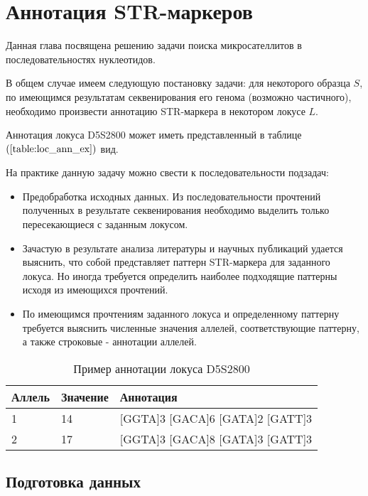 \chapter{Аннотация STR-маркеров}

Данная глава посвящена решению задачи поиска микросателлитов в последовательностях нуклеотидов.

В общем случае имеем следующую постановку задачи:
для некоторого образца $S$, по имеющимся результатам секвенирования его генома (возможно частичного),
необходимо произвести аннотацию STR-маркера в некотором локусе $L$.

\begin{Example}
Аннотация локуса D5S2800 может иметь представленный в таблице $\left(\ref{table:loc_ann_ex}\right)$ вид.
\end{Example}

На практике данную задачу можно свести к последовательности подзадач:
\begin{itemize}
\item Предобработка исходных данных. Из последовательности прочтений полученных в результате секвенирования
необходимо выделить только пересекающиеся с заданным локусом.
\item Зачастую в результате анализа литературы и научных публикаций удается выяснить,
что собой представляет паттерн STR-маркера для заданного локуса. Но иногда требуется
определить наиболее подходящие паттерны исходя из имеющихся прочтений.
\item По имеющимся прочтениям заданного локуса и определенному паттерну требуется
выяснить численные значения аллелей, соответствующие паттерну, а также строковые - аннотации аллелей.
\end{itemize}

\begin{table}[h]
\begin{center}
  \begin{tabular}{| p{2cm} | p{2cm}| p{9cm}|}
  \hline
     Аллель	& Значение & Аннотация \\ \hline
     1 & 14 & [GGTA]3 [GACA]6 [GATA]2 [GATT]3 \\ \hline
     2 & 17 & [GGTA]3 [GACA]8 [GATA]3 [GATT]3 \\ \hline
   \end{tabular}
  \end{center}
  \caption[c]{Пример аннотации локуса D5S2800}
  \label{table:loc_ann_ex}
\end{table}

\section{Подготовка данных}

